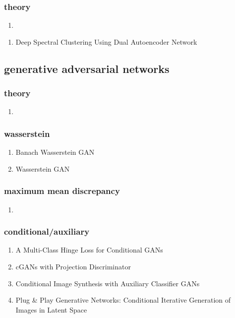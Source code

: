 \documentclass[acmlarge]{acmart}
\begin{document}
		\subsubsection{theory}
		\begin{enumerate}
			\item
		\end{enumerate}
	\begin{enumerate}
		\item Deep Spectral Clustering Using Dual Autoencoder Network \cite{Yang2019DeepSC} 

	\end{enumerate}
	\subsection{generative adversarial networks}
		\subsubsection{theory}
		\begin{enumerate}
			\item
		\end{enumerate}
		\subsubsection{wasserstein}
		\begin{enumerate}
			\item Banach Wasserstein GAN \cite{Adler2018BanachWG} 

			\item Wasserstein GAN \cite{Arjovsky2017WassersteinG} 

		\end{enumerate}
		\subsubsection{maximum mean discrepancy}
		\begin{enumerate}
			\item
		\end{enumerate}
		\subsubsection{conditional/auxiliary}
		\begin{enumerate}
			\item A Multi-Class Hinge Loss for Conditional GANs \cite{Kavalerov2021AMH} 

			\item cGANs with Projection Discriminator \cite{Miyato2018cGANsWP} 

			\item Conditional Image Synthesis with Auxiliary Classifier GANs \cite{Odena2017ConditionalIS} 

			\item Plug \& Play Generative Networks: Conditional Iterative Generation of Images in Latent Space \cite{Nguyen2017PlugP} 

		\end{enumerate}
\end{document}
